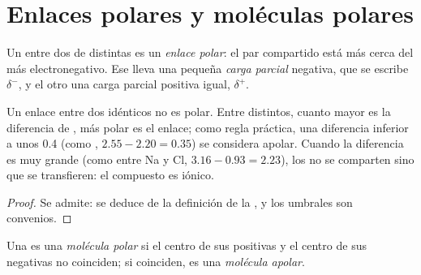 \section{Enlaces polares y moléculas polares}

\begin{definition}\label{def:g11:polarity-and-cohesion:polar-bond}
Un  entre dos  de  distintas
es un \emph{enlace polar}: el par compartido está
más cerca del  más electronegativo. Ese  lleva una pequeña
\emph{carga parcial} negativa, que se escribe
$\delta^-$, y el otro  una carga parcial positiva igual,
$\delta^+$.
\end{definition}

\begin{proposition}\label{prop:g11:polarity-and-cohesion:polar-bond}
Un enlace entre dos  idénticos no es polar. Entre 
distintos, cuanto mayor es la diferencia de , más
polar es el enlace; como regla práctica, una diferencia inferior a unos
0.4 (como , $2.55 - 2.20 = 0.35$) se considera apolar. Cuando la
diferencia es muy grande (como entre Na y Cl, $3.16 - 0.93 = 2.23$), los
 no se comparten sino que se transfieren: el compuesto es
iónico.
\end{proposition}

\begin{proof}
Se admite: se deduce de la definición de la , y los
umbrales son convenios.
\end{proof}

\begin{definition}\label{def:g11:polarity-and-cohesion:polar-molecule}
Una  es una \emph{molécula polar} si el
centro de sus  positivas y el centro de sus  negativas no coinciden; si coinciden, es una
\emph{molécula apolar}.
\end{definition}

